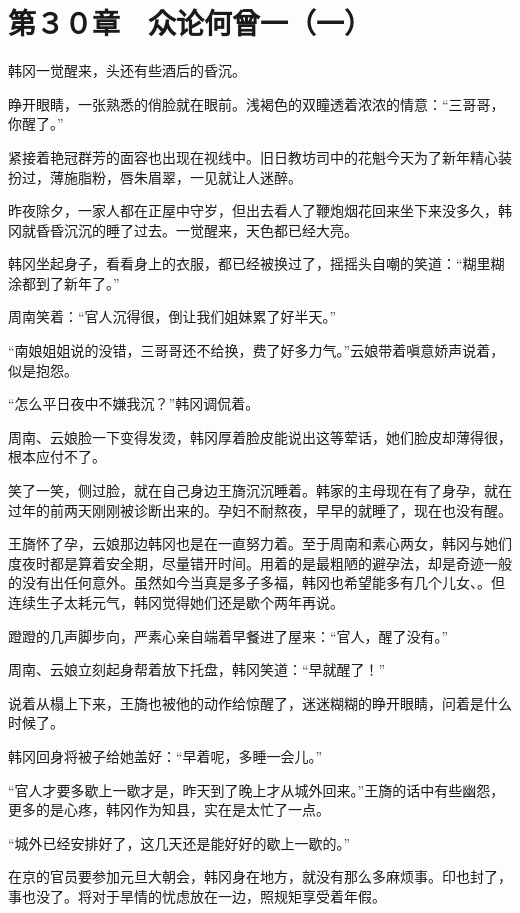 \section{第３０章　众论何曾一（一）}

韩冈一觉醒来，头还有些酒后的昏沉。

睁开眼睛，一张熟悉的俏脸就在眼前。浅褐色的双瞳透着浓浓的情意：“三哥哥，你醒了。”

紧接着艳冠群芳的面容也出现在视线中。旧日教坊司中的花魁今天为了新年精心装扮过，薄施脂粉，唇朱眉翠，一见就让人迷醉。

昨夜除夕，一家人都在正屋中守岁，但出去看人了鞭炮烟花回来坐下来没多久，韩冈就昏昏沉沉的睡了过去。一觉醒来，天色都已经大亮。

韩冈坐起身子，看看身上的衣服，都已经被换过了，摇摇头自嘲的笑道：“糊里糊涂都到了新年了。”

周南笑着：“官人沉得很，倒让我们姐妹累了好半天。”

“南娘姐姐说的没错，三哥哥还不给换，费了好多力气。”云娘带着嗔意娇声说着，似是抱怨。

“怎么平日夜中不嫌我沉？”韩冈调侃着。

周南、云娘脸一下变得发烫，韩冈厚着脸皮能说出这等荤话，她们脸皮却薄得很，根本应付不了。

笑了一笑，侧过脸，就在自己身边王旖沉沉睡着。韩家的主母现在有了身孕，就在过年的前两天刚刚被诊断出来的。孕妇不耐熬夜，早早的就睡了，现在也没有醒。

王旖怀了孕，云娘那边韩冈也是在一直努力着。至于周南和素心两女，韩冈与她们度夜时都是算着安全期，尽量错开时间。用着的是最粗陋的避孕法，却是奇迹一般的没有出任何意外。虽然如今当真是多子多福，韩冈也希望能多有几个儿女、。但连续生子太耗元气，韩冈觉得她们还是歇个两年再说。

蹬蹬的几声脚步向，严素心亲自端着早餐进了屋来：“官人，醒了没有。”

周南、云娘立刻起身帮着放下托盘，韩冈笑道：“早就醒了！”

说着从榻上下来，王旖也被他的动作给惊醒了，迷迷糊糊的睁开眼睛，问着是什么时候了。

韩冈回身将被子给她盖好：“早着呢，多睡一会儿。”

“官人才要多歇上一歇才是，昨天到了晚上才从城外回来。”王旖的话中有些幽怨，更多的是心疼，韩冈作为知县，实在是太忙了一点。

“城外已经安排好了，这几天还是能好好的歇上一歇的。”

在京的官员要参加元旦大朝会，韩冈身在地方，就没有那么多麻烦事。印也封了，事也没了。将对于旱情的忧虑放在一边，照规矩享受着年假。

